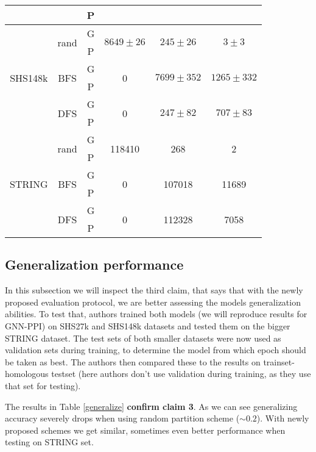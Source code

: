 \begin{table}[h]
\begin{tabular}{cccccc}
    & & P &  & \\
    \midrule
    \multirow{6}{*}{SHS148k} & \multirow{2}{*}{rand} & G  &  \multirow{2}{*}{$8649 \pm 26$} &    \multirow{2}{*}{$245 \pm 26$} &       \multirow{2}{*}{$3 \pm 3$} \\
    & & P & & \\
    & \multirow{2}{*}{BFS}   & G  &     \multirow{2}{*}{0} &  \multirow{2}{*}{$7699 \pm 352$} &  \multirow{2}{*}{$1265 \pm 332$} \\
    & & P & & \\
    & \multirow{2}{*}{DFS}   & G  &      \multirow{2}{*}{0} &   \multirow{2}{*}{$247 \pm 82$} &    \multirow{2}{*}{$707 \pm 83$} \\
    & & P &  & \\
    \midrule
    \multirow{6}{*}{STRING} & \multirow{2}{*}{rand} & G &  \multirow{2}{*}{118410} &    \multirow{2}{*}{268} &       \multirow{2}{*}{2} \\
    & & P  & & \\
    & \multirow{2}{*}{BFS}  & G    &       \multirow{2}{*}{0} &  \multirow{2}{*}{107018} &  \multirow{2}{*}{11689} \\
    & & P & & \\
    & \multirow{2}{*}{DFS}  & G    &       \multirow{2}{*}{0} &   \multirow{2}{*}{112328} &    \multirow{2}{*}{7058} \\
    & & P & & \\
    \bottomrule
    \end{tabular}

\end{table}

\subsection{Generalization performance}
In this subsection we will inspect the third claim, that says that with the newly proposed evaluation protocol, we are better assessing the models generalization abilities. To test that, authors trained both models (we will reproduce results for GNN-PPI) on SHS27k and SHS148k datasets and tested them on the bigger STRING dataset. The test sets of both smaller datasets were now used as validation sets during training, to determine the model from which epoch should be taken as best. The authors then compared these to the results on trainset-homologous testset (here authors don't use validation during training, as they use that set for testing).

The results in Table \ref{generalize} \textbf{confirm claim 3}. As we can see generalizing accuracy severely drops when using random partition scheme ($\sim 0.2$). With newly proposed schemes we get similar, sometimes even better performance when testing on STRING set. 

